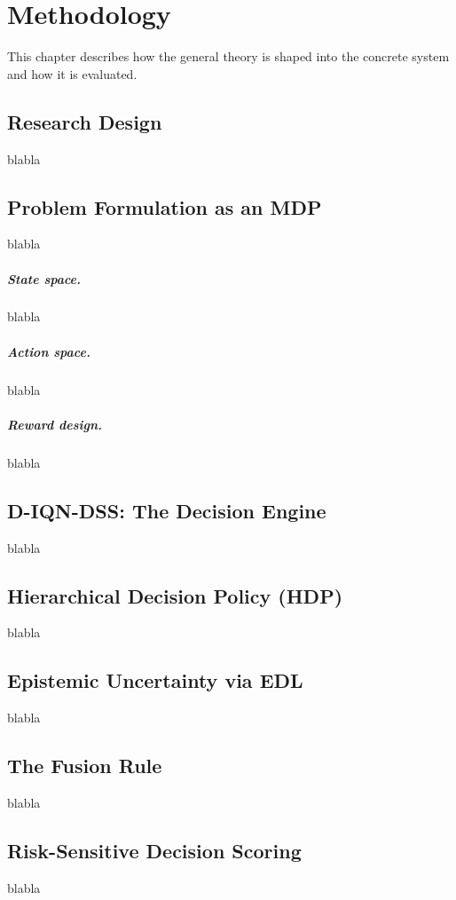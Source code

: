 \chapter{Methodology}

This chapter describes how the general theory is shaped into the concrete
system and how it is evaluated.

\section{Research Design}
blabla

\section{Problem Formulation as an MDP}
blabla

\paragraph{State space.}
blabla

\paragraph{Action space.}
blabla

\paragraph{Reward design.}
blabla

\section{D-IQN-DSS: The Decision Engine}
blabla

\section{Hierarchical Decision Policy (HDP)}
blabla

\section{Epistemic Uncertainty via EDL}
blabla

\section{The Fusion Rule}
blabla

\section{Risk-Sensitive Decision Scoring}
blabla

